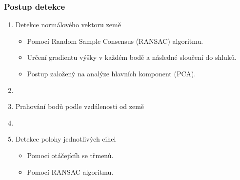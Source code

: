 \begin{frame}
    \frametitle{Postup detekce}
    \begin{enumerate}
        \item Detekce normálového vektoru země
            \begin{itemize}
                \item Pomocí Random Sample Consensus (RANSAC) algoritmu.
                \item Určení gradientu výšky v každém bodě a následné sloučení do shluků.
                \item Postup založený na analýze hlavních komponent (PCA).
            \end{itemize}
        \item[~] 
        \item Prahování bodů podle vzdálenosti od země
        \item[~] 
        \item Detekce polohy jednotlivých cihel
            \begin{itemize}
                \item Pomocí otáčejícíh se třmenů.
                \item Pomocí RANSAC algoritmu.
            \end{itemize}
    \end{enumerate}
\end{frame}

